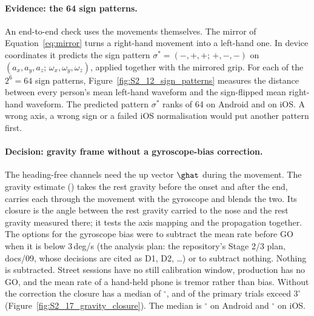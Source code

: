 \paragraph{Evidence: the 64 sign patterns.} An end-to-end check uses the movements themselves. The mirror of
Equation~\eqref{eq:mirror} turns a right-hand movement into a left-hand one. In device coordinates it predicts
the sign pattern $\sigma^* = (-,+,+;\,+,-,-)$ on $(a_x, a_y, a_z;\, \omega_x, \omega_y, \omega_z)$, applied
together with the mirrored grip. For each of the $2^6 = 64$ sign patterns, Figure~\ref{fig:S2_12_sign_patterns}
measures the distance between every person's mean left-hand waveform and the sign-flipped mean right-hand
waveform. The predicted pattern $\sigma^*$ ranks  of 64 on Android and
 on iOS. A wrong axis, a wrong sign or a failed iOS normalisation would put
another pattern first.

\paragraph{Decision: gravity frame without a gyroscope-bias correction.} The heading-free channels need the up
vector $\ghat$ during the movement. The gravity estimate () takes the rest gravity before the
onset and after the end, carries each through the movement with the gyroscope and blends the two. Its closure
is the angle between the rest gravity carried to the nose and the rest gravity measured there; it tests the axis
mapping and the propagation together. The options for the gyroscope bias were to subtract the mean rate before
GO when it is below 3\,deg/s (the analysis plan: the repository's Stage 2/3 plan, docs/09, whose decisions are
cited as D1, D2, \dots) or to subtract nothing. Nothing is subtracted. Street sessions
have no still calibration window, production has no GO, and the mean rate of a hand-held phone is tremor rather
than bias. Without the correction the closure has a median of $^\circ$, and
 of the primary trials exceed $3^\circ$
(Figure~\ref{fig:S2_17_gravity_closure}). The median is $^\circ$ on
Android and $^\circ$ on iOS.

